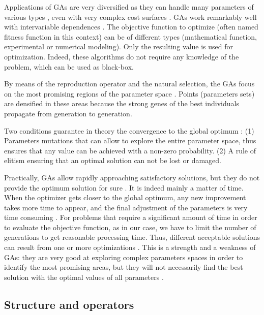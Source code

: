\documentclass[twocol]{ametsoc}
\begin{document}
Applications of GAs are very diversified as they can handle many parameters of various types \citep{Joines1996a}, even with very complex cost surfaces \citep{Haupt2004}. GAs work remarkably well with intervariable dependences \citep{Haupt2004}. The objective function to optimize (often named fitness function in this context) can be of different types (mathematical function, experimental or numerical modeling). Only the resulting value is used for optimization. Indeed, these algorithms do not require any knowledge of the problem, which can be used as black-box.

By means of the reproduction operator and the natural selection, the GAs focus on the most promising regions of the parameter space \citep{Holland1992b}. Points (parameters sets) are densified in these areas because the strong genes of the best individuals propagate from generation to generation.

Two conditions guarantee in theory the convergence to the global optimum \citep{Zitzler2004a}: (1) Parameters mutations that can allow to explore the entire parameter space, thus ensures that any value can be achieved with a non-zero probability. (2) A rule of elitism ensuring that an optimal solution can not be lost or damaged.

Practically, GAs allow rapidly approaching satisfactory solutions, but they do not provide the optimum solution for sure \citep{Zitzler2004a}. It is indeed mainly a matter of time. When the optimizer gets closer to the global optimum, any new improvement takes more time to appear, and the final adjustment of the parameters is very time consuming \citep{Back1993a}. For problems that require a significant amount of time in order to evaluate the objective function, as in our case, we have to limit the number of generations to get reasonable processing time. Thus, different acceptable solutions can result from one or more optimizations \citep{Holland1992b}. This is a strength and a weakness of GAs: they are very good at exploring complex parameters spaces in order to identify the most promising areas, but they will not necessarily find the best solution with the optimal values of all parameters \citep{Holland1992b}.


\subsection{Structure and operators}
\end{document}
